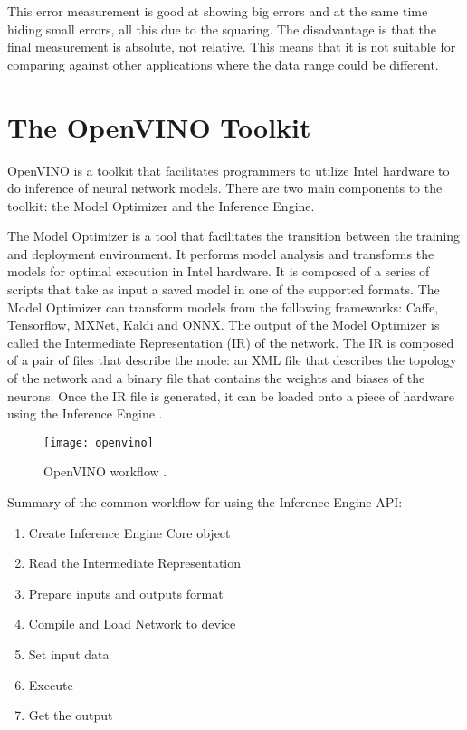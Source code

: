 This error measurement is good at showing big errors and at the same time hiding small errors, all this due to the squaring. The disadvantage is that the final measurement is absolute, not relative. This means that it is not suitable for comparing against other applications where the data range could be different.

\section{The OpenVINO Toolkit}

OpenVINO is a toolkit that facilitates programmers to utilize Intel hardware to do inference of neural network models. There are two main components to the toolkit: the Model Optimizer and the Inference Engine.

The Model Optimizer is a tool that facilitates the transition between the training and deployment environment. It performs model analysis and transforms the models for optimal execution in Intel hardware. It is composed of a series of scripts that take as input a saved model in one of the supported formats. The Model Optimizer can transform models from the following frameworks: Caffe, Tensorflow, MXNet, Kaldi and ONNX. The output of the Model Optimizer is called the Intermediate Representation (IR) of the network. The IR is composed of a pair of files that describe the mode: an XML file that describes the topology of the network and a binary file that contains the weights and biases of the neurons. Once the IR file is generated, it can be loaded onto a piece of hardware using the Inference Engine \cite{openvino_toolkit}.

\begin{figure}[thbp]
	\centering
	\texttt{[image: openvino]}
	\caption[OpenVINO workflow.]{OpenVINO workflow \cite{openvino_toolkit}.}
	\label{fig:openvino}
\end{figure}

Summary of the common workflow for using the Inference Engine API:

\begin{enumerate}
    \itemsep0em
	\item Create Inference Engine Core object
	\item Read the Intermediate Representation 
	\item Prepare inputs and outputs format
	\item Compile and Load Network to device
	\item Set input data
	\item Execute
	\item Get the output
\end{enumerate}
\item

